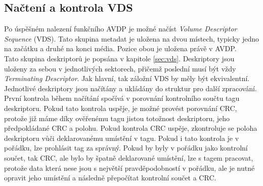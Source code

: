 \subsection{Načtení a kontrola VDS}
Po úspěšném nalezení funkčního AVDP je možné načíst \textit{Volume Descriptor Sequence} (VDS). Tato skupina metadat je uložena na dvou místech, typicky jedno na začátku a druhé na konci média. Pozice obou je uložena právě v AVDP.\\
Tato skupina deskriptorů je popsána v kapitole \ref{sec:vds}. Deskriptory jsou uloženy za sebou v jednotlivých sektorech, přičemž poslední musí být vždy \textit{Terminating Descriptor}. Jak hlavní, tak záložní VDS by měly být ekvivalentní.\\
Jednotlivé deskriptory jsou načítány a ukládány do struktur pro další zpracování. První kontrola během načítání spočívá v porovnání kontrolního součtu tagu deskriptoru. Pokud tato kontrola uspěje, je možné provést porovnání CRC, protože již máme díky ověřenému tagu jistou totožnost deskriptoru, jeho předpokládané CRC a polohu. Pokud kontrola CRC uspěje, zkontroluje se poloha deskriptoru vůči deklarovanému umístění v tagu. Pokud i tato kontrola je v pořádku, lze prohlásit tag za správný. Pokud by byly v pořádku jako kontrolní součet, tak CRC, ale bylo by špatně deklarované umístění, lze s tagem pracovat, protože data která nese jsou s největší pravděpodobností v pořádku, ale je nutné opravit jeho umístění a následně přepočítat kontrolní součet a CRC. 

